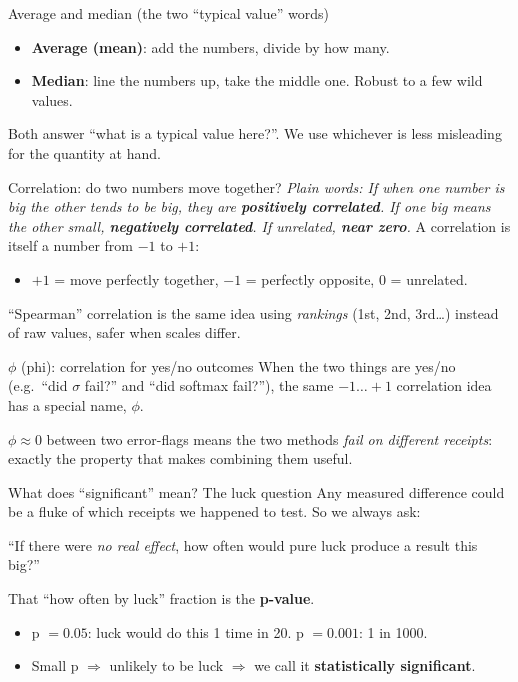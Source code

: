 \documentclass[aspectratio=169]{beamer}
\newcommand{\bigq}[1]{\begin{center}{\Large #1}\end{center}}
\newcommand{\keybox}[1]{\begin{center}\colorbox{grey!15}{\parbox{0.92\linewidth}{\centering #1}}\end{center}}
\newcommand{\plain}[1]{\textit{\textcolor{sig}{Plain words:} #1}}
\begin{document}
\begin{frame}{Average and median (the two ``typical value'' words)}
\begin{itemize}
\item \textbf{Average (mean)}: add the numbers, divide by how many.
\item \textbf{Median}: line the numbers up, take the middle one.
Robust to a few wild values.
\end{itemize}
\vspace{1em}
\keybox{Both answer ``what is a typical value here?''. We use whichever
is less misleading for the quantity at hand.}
\end{frame}

\begin{frame}{Correlation: do two numbers move together?}
\plain{If when one number is big the other tends to be big, they are
\textbf{positively correlated}. If one big means the other small,
\textbf{negatively correlated}. If unrelated, \textbf{near zero}.}
\vspace{0.8em}
A correlation is itself a number from $-1$ to $+1$:
\begin{itemize}
\item $+1$ = move perfectly together, $-1$ = perfectly opposite,
$0$ = unrelated.
\end{itemize}
``Spearman'' correlation is the same idea using \emph{rankings}
(1st, 2nd, 3rd\dots) instead of raw values, safer when scales
differ.
\end{frame}

\begin{frame}{$\phi$ (phi): correlation for yes/no outcomes}
When the two things are yes/no (e.g.\ ``did $\sigma$ fail?'' and
``did softmax fail?''), the same $-1\ldots+1$ correlation idea has a
special name, \textbf{$\phi$}.
\vspace{0.8em}
\keybox{$\phi \approx 0$ between two error-flags means the two methods
\emph{fail on different receipts}: exactly the property that makes
combining them useful.}
\end{frame}

\begin{frame}{What does ``significant'' mean? The luck question}
Any measured difference could be a fluke of which receipts we happened
to test. So we always ask:
\bigq{``If there were \emph{no real effect}, how often would pure luck
produce a result this big?''}
That ``how often by luck'' fraction is the \textbf{p-value}.
\begin{itemize}
\item p $=0.05$: luck would do this 1 time in 20. \quad p $=0.001$:
1 in 1000.
\item Small p $\Rightarrow$ unlikely to be luck $\Rightarrow$ we call
it \textbf{statistically significant}.
\end{itemize}
\end{frame}
\end{document}
